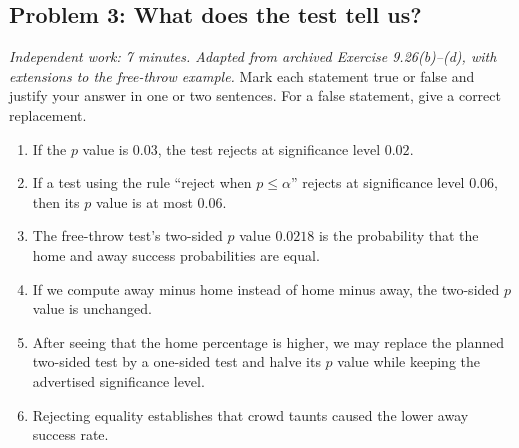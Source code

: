 \documentclass[11pt]{article}
\newcommand{\workingspace}[1]{}
\newcommand{\workingspace}[1]{\vspace{#1}}
\begin{document}
\newpage
\subsection*{Problem 3: What does the test tell us?}
\noindent\textit{Independent work: 7 minutes. Adapted from archived Exercise
9.26(b)--(d), with extensions to the free-throw example.}
Mark each statement true or false and justify your answer in one or two
sentences. For a false statement, give a correct replacement.
\begin{enumerate}
 \item If the $p$ value is $0.03$, the test rejects at significance level $0.02$.
 \item If a test using the rule ``reject when $p\leq\alpha$'' rejects at
 significance level $0.06$, then its $p$ value is at most $0.06$.
 \item The free-throw test's two-sided $p$ value $0.0218$ is the probability
 that the home and away success probabilities are equal.
 \item If we compute away minus home instead of home minus away, the
 two-sided $p$ value is unchanged.
 \item After seeing that the home percentage is higher, we may replace
 the planned two-sided test by a one-sided test and halve its $p$ value
 while keeping the advertised significance level.
 \item Rejecting equality establishes that crowd taunts caused the lower
 away success rate.
\end{enumerate}
\workingspace{9cm}
\end{document}
